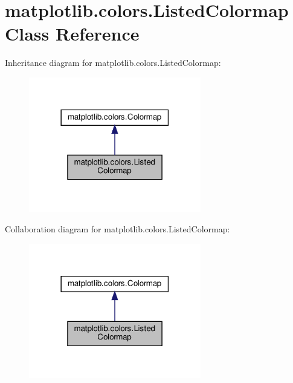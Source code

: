 \hypertarget{classmatplotlib_1_1colors_1_1ListedColormap}{}\section{matplotlib.\+colors.\+Listed\+Colormap Class Reference}
\label{classmatplotlib_1_1colors_1_1ListedColormap}


Inheritance diagram for matplotlib.\+colors.\+Listed\+Colormap\+:
\nopagebreak
\begin{figure}[H]
\begin{center}
\leavevmode
\includegraphics[width=213pt]{classmatplotlib_1_1colors_1_1ListedColormap__inherit__graph}
\end{center}
\end{figure}


Collaboration diagram for matplotlib.\+colors.\+Listed\+Colormap\+:
\nopagebreak
\begin{figure}[H]
\begin{center}
\leavevmode
\includegraphics[width=213pt]{classmatplotlib_1_1colors_1_1ListedColormap__coll__graph}
\end{center}
\end{figure}
